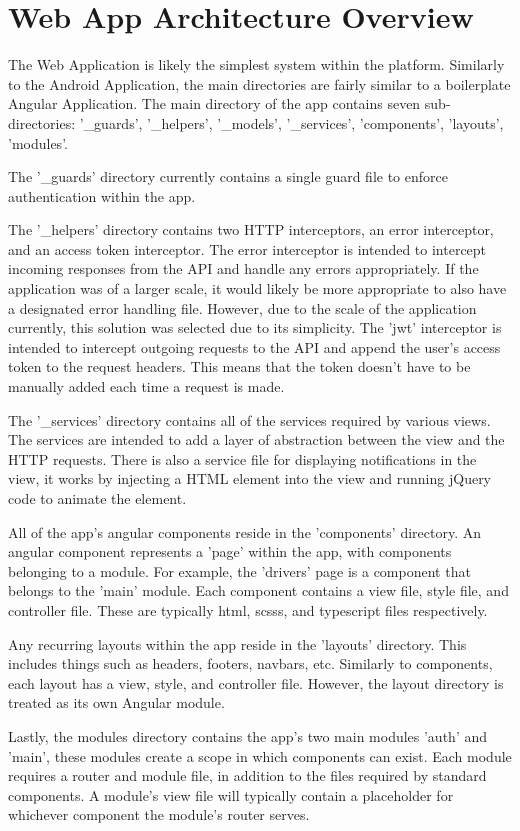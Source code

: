 \section{Web App Architecture Overview}
The Web Application is likely the simplest system within the platform. Similarly to the Android Application, the main directories are fairly similar to a boilerplate Angular Application. The main directory of the app contains seven sub-directories: '\_guards', '\_helpers', '\_models', '\_services', 'components', 'layouts', 'modules'.

The '\_guards' directory currently contains a single guard file to enforce authentication within the app.

The '\_helpers' directory contains two HTTP interceptors, an error interceptor, and an access token interceptor. The error interceptor is intended to intercept incoming responses from the API and handle any errors appropriately. If the application was of a larger scale, it would likely be more appropriate to also have a designated error handling file. However, due to the scale of the application currently, this solution was selected due to its simplicity. The 'jwt' interceptor is intended to intercept outgoing requests to the API and append the user's access token to the request headers. This means that the token doesn't have to be manually added each time a request is made.

The '\_services' directory contains all of the services required by various views. The services are intended to add a layer of abstraction between the view and the HTTP requests. There is also a service file for displaying notifications in the view, it works by injecting a HTML element into the view and running jQuery code to animate the element.

All of the app's angular components reside in the 'components' directory. An angular component represents a 'page' within the app, with components belonging to a module. For example, the 'drivers' page is a component that belongs to the 'main' module. Each component contains a view file, style file, and controller file. These are typically html, scsss, and typescript files respectively.

Any recurring layouts within the app reside in the 'layouts' directory. This includes things such as headers, footers, navbars, etc. Similarly to components, each layout has a view, style, and controller file. However, the layout directory is treated as its own Angular module.

Lastly, the modules directory contains the app's two main modules 'auth' and 'main', these modules create a scope in which components can exist. Each module requires a router and module file, in addition to the files required by standard components. A module's view file will typically contain a placeholder for whichever component the module's router serves.

